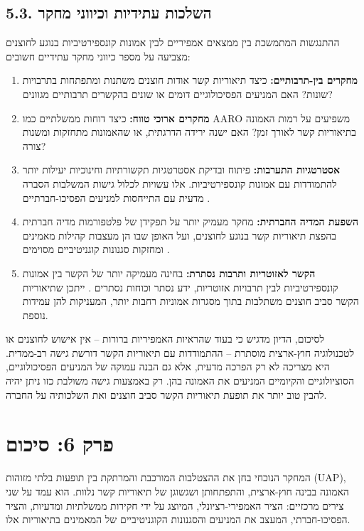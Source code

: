 \documentclass[12pt,a4paper]{article}
\begin{document}
\subsection{5.3. השלכות עתידיות וכיווני מחקר}
ההתנגשות המתמשכת בין ממצאים אמפיריים לבין אמונות קונספירטיביות בנוגע לחוצנים מצביעה על מספר כיווני מחקר עתידיים חשובים:

\begin{enumerate}
    \item \textbf{מחקרים בין-תרבותיים:} כיצד תיאוריות קשר אודות חוצנים משתנות ומתפתחות בתרבויות שונות? האם המניעים הפסיכולוגיים דומים או שונים בהקשרים תרבותיים מגוונים?
    \item \textbf{מחקרים ארוכי טווח:} כיצד דוחות ממשלתיים כמו AARO משפיעים על רמות האמונה בתיאוריות קשר לאורך זמן? האם ישנה ירידה הדרגתית, או שהאמונות מתחזקות ומשנות צורה?
    \item \textbf{אסטרטגיות התערבות:} פיתוח ובדיקת אסטרטגיות תקשורתיות וחינוכיות יעילות יותר להתמודדות עם אמונות קונספירטיביות. אלו עשויות לכלול גישות המשלבות הסברה מדעית עם התייחסות למניעים הפסיכו-חברתיים \cite{2, 4}.
    \item \textbf{השפעת המדיה החברתית:} מחקר מעמיק יותר על תפקידן של פלטפורמות מדיה חברתית בהפצת תיאוריות קשר בנוגע לחוצנים, ועל האופן שבו הן מעצבות קהילות מאמינים ומחזקות סגנונות קוגניטיביים מסוימים \cite{1, 5}.
    \item \textbf{הקשר לאזוטריות ותרבות נסתרת:} בחינה מעמיקה יותר של הקשר בין אמונות קונספירטיביות לבין תרבויות אזוטריות, ידע נסתר וכוחות נסתרים \cite{5}. ייתכן שתיאוריות הקשר סביב חוצנים משתלבות בתוך מסגרות אמוניות רחבות יותר, המעניקות להן עמידות נוספת.
\end{enumerate}

לסיכום, הדיון מדגיש כי בעוד שהראיות האמפיריות ברורות – אין אישוש לחוצנים או לטכנולוגיה חוץ-ארצית מוסתרת – ההתמודדות עם תיאוריות הקשר דורשת גישה רב-ממדית. היא מצריכה לא רק הפרכה מדעית, אלא גם הבנה עמוקה של המניעים הפסיכולוגיים, הסוציולוגיים והקיומיים המניעים את האמונה בהן. רק באמצעות גישה משולבת כזו ניתן יהיה להבין טוב יותר את תופעת תיאוריות הקשר סביב חוצנים ואת השלכותיה על החברה.

\section{פרק 6: סיכום}
המחקר הנוכחי בחן את ההצטלבות המורכבת והמרתקת בין תופעות בלתי מזוהות (UAP), האמונה בבינה חוץ-ארצית, והתפתחותן ושגשוגן של תיאוריות קשר נלוות. הוא עמד על שני צירים מרכזיים: הציר האמפירי-רציונלי, המיוצג על ידי חקירות ממשלתיות ומדעיות, והציר הפסיכו-חברתי, המעצב את המניעים והסגנונות הקוגניטיביים של המאמינים בתיאוריות אלו.
\end{document}
